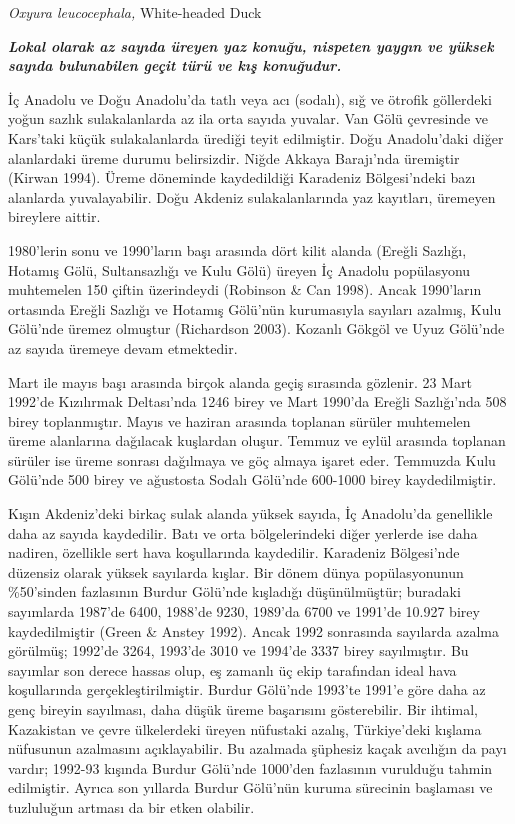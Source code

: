 \documentclass[
  letterpaper,
  DIV=11,
  numbers=noendperiod]{scrreprt}
\begin{document}
\emph{Oxyura leucocephala,} White-headed Duck

\textbf{\emph{Lokal olarak az sayıda üreyen yaz konuğu, nispeten yaygın
ve yüksek sayıda bulunabilen geçit türü ve kış konuğudur.}}

İç Anadolu ve Doğu Anadolu'da tatlı veya acı (sodalı), sığ ve ötrofik
göllerdeki yoğun sazlık sulakalanlarda az ila orta sayıda yuvalar. Van
Gölü çevresinde ve Kars'taki küçük sulakalanlarda ürediği teyit
edilmiştir. Doğu Anadolu'daki diğer alanlardaki üreme durumu
belirsizdir. Niğde Akkaya Barajı'nda üremiştir (Kirwan 1994). Üreme
döneminde kaydedildiği Karadeniz Bölgesi'ndeki bazı alanlarda
yuvalayabilir. Doğu Akdeniz sulakalanlarında yaz kayıtları, üremeyen
bireylere aittir.

1980'lerin sonu ve 1990'ların başı arasında dört kilit alanda (Ereğli
Sazlığı, Hotamış Gölü, Sultansazlığı ve Kulu Gölü) üreyen İç Anadolu
popülasyonu muhtemelen 150 çiftin üzerindeydi (Robinson \& Can 1998).
Ancak 1990'ların ortasında Ereğli Sazlığı ve Hotamış Gölü'nün
kurumasıyla sayıları azalmış, Kulu Gölü'nde üremez olmuştur (Richardson
2003). Kozanlı Gökgöl ve Uyuz Gölü'nde az sayıda üremeye devam
etmektedir.

Mart ile mayıs başı arasında birçok alanda geçiş sırasında gözlenir. 23
Mart 1992'de Kızılırmak Deltası'nda 1246 birey ve Mart 1990'da Ereğli
Sazlığı'nda 508 birey toplanmıştır. Mayıs ve haziran arasında toplanan
sürüler muhtemelen üreme alanlarına dağılacak kuşlardan oluşur. Temmuz
ve eylül arasında toplanan sürüler ise üreme sonrası dağılmaya ve göç
almaya işaret eder. Temmuzda Kulu Gölü'nde 500 birey ve ağustosta Sodalı
Gölü'nde 600-1000 birey kaydedilmiştir.

Kışın Akdeniz'deki birkaç sulak alanda yüksek sayıda, İç Anadolu'da
genellikle daha az sayıda kaydedilir. Batı ve orta bölgelerindeki diğer
yerlerde ise daha nadiren, özellikle sert hava koşullarında kaydedilir.
Karadeniz Bölgesi'nde düzensiz olarak yüksek sayılarda kışlar. Bir dönem
dünya popülasyonunun \%50'sinden fazlasının Burdur Gölü'nde kışladığı
düşünülmüştür; buradaki sayımlarda 1987'de 6400, 1988'de 9230, 1989'da
6700 ve 1991'de 10.927 birey kaydedilmiştir (Green \& Anstey 1992).
Ancak 1992 sonrasında sayılarda azalma görülmüş; 1992'de 3264, 1993'de
3010 ve 1994'de 3337 birey sayılmıştır. Bu sayımlar son derece hassas
olup, eş zamanlı üç ekip tarafından ideal hava koşullarında
gerçekleştirilmiştir. Burdur Gölü'nde 1993'te 1991'e göre daha az genç
bireyin sayılması, daha düşük üreme başarısını gösterebilir. Bir
ihtimal, Kazakistan ve çevre ülkelerdeki üreyen nüfustaki azalış,
Türkiye'deki kışlama nüfusunun azalmasını açıklayabilir. Bu azalmada
şüphesiz kaçak avcılığın da payı vardır; 1992-93 kışında Burdur Gölü'nde
1000'den fazlasının vurulduğu tahmin edilmiştir. Ayrıca son yıllarda
Burdur Gölü'nün kuruma sürecinin başlaması ve tuzluluğun artması da bir
etken olabilir.
\end{document}

